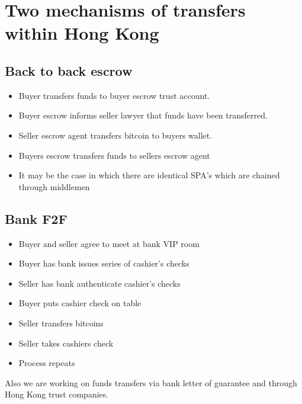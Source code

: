 \documentclass[10pt]{article}
\begin{document}
\section{Two mechanisms of transfers within Hong Kong}

\subsection{Back to back escrow}

\begin{itemize}
\item Buyer transfers funds to buyer escrow trust account.
\item Buyer escrow informs seller lawyer that funds have been transferred.
\item Seller escrow agent transfers bitcoin to buyers wallet.
\item Buyers escrow transfers funds to sellers escrow agent
\item It may be the case in which there are identical SPA's which are
  chained through middlemen
\end{itemize}

\subsection{Bank F2F}

\begin{itemize}
\item Buyer and seller agree to meet at bank VIP room
\item Buyer has bank issues series of cashier’s checks
\item Seller has bank authenticate cashier’s checks
\item Buyer puts cashier check on table
\item Seller transfers bitcoins
\item Seller takes cashiers check
\item Process repeats
\end{itemize}

Also we are working on funds transfers via bank letter of guarantee
and through Hong Kong trust companies.
\end{document}
